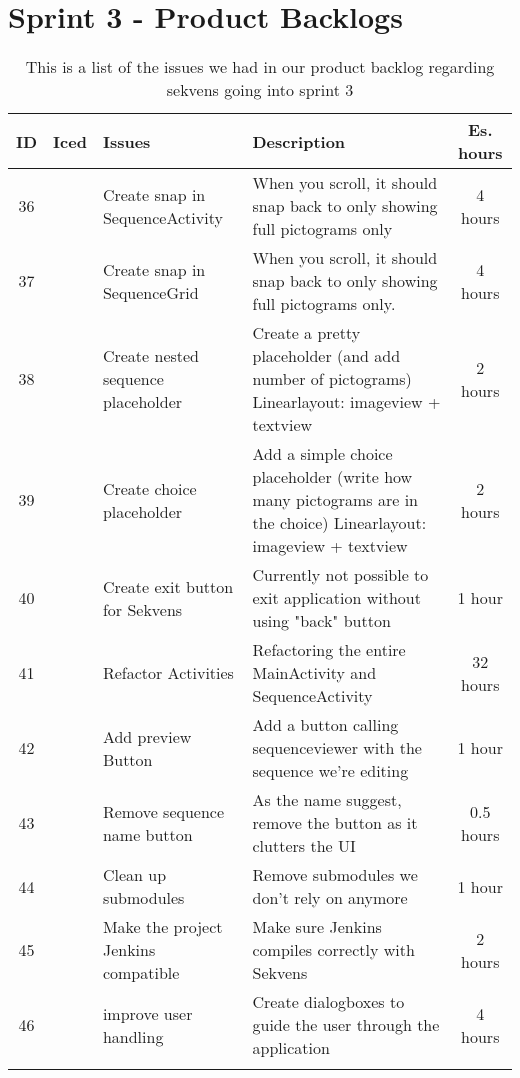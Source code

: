 \section{Sprint 3 - Product Backlogs}
\begin{longtable} { | c | c | p{5cm} | p{5cm} | c | } 
\hline
	ID 	&	Iced	&	Issues	&	Description		&	 Es. hours \\\hline
	36	& 	 	&	Create snap in SequenceActivity		& 	When you scroll, it should snap back to only showing full pictograms only	 & 4 hours \\\hline
	37	& 	 	&	Create snap in SequenceGrid		& 	When you scroll, it should snap back to only showing full pictograms only.	 & 4 hours \\\hline
	38	&		 &	Create nested sequence placeholder 	 &	Create a pretty placeholder (and add number of pictograms) Linearlayout: imageview + textview			 &	2 hours\\\hline
	39	&		 &	Create choice placeholder &	Add a simple choice placeholder (write how many pictograms are in the choice) Linearlayout: imageview + textview	 &	2 hours \\\hline
	40	&		 &	Create exit button for Sekvens	 &		Currently not possible to exit application without using "back" button	 &	 1 hour		\\\hline
	41	&		 &	Refactor Activities		 &		Refactoring the entire MainActivity and SequenceActivity	 &	32 hours \\\hline
	42	&		 &	Add preview Button		 &		Add a button calling sequenceviewer with the sequence we're editing		 & 1 hour	\\\hline
	43	&		 &	Remove sequence name button	 &	As the name suggest, remove the button as it clutters the UI		 &	0.5 hours \\\hline
	44	&		 & 	Clean up submodules  &		Remove submodules we don't rely on anymore	 &	1 hour\\\hline
	45	&		 &	Make the project Jenkins compatible		 &		Make sure Jenkins compiles correctly with Sekvens			 &	2 hours \\\hline
	46	&		 &	improve user handling 		 &		Create dialogboxes to guide the user through the application		 &	4 hours \\\hline
\caption{This is a list of the issues we had in our product backlog regarding sekvens going into sprint 3}
\label{tab:spr3_prodblog}
\end{longtable}

